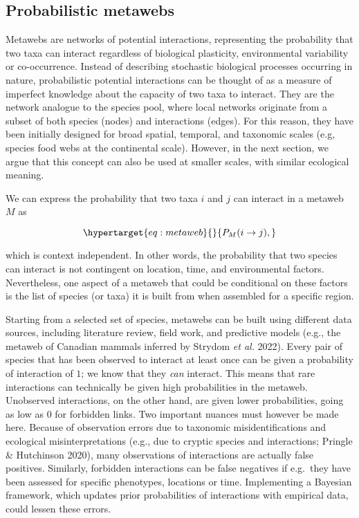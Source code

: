 \documentclass[11pt]{article}
\begin{document}
\hypertarget{probabilistic-metawebs}{%
\subsection{Probabilistic metawebs}\label{probabilistic-metawebs}}

Metawebs are networks of potential interactions, representing the
probability that two taxa can interact regardless of biological
plasticity, environmental variability or co-occurrence. Instead of
describing stochastic biological processes occurring in nature,
probabilistic potential interactions can be thought of as a measure of
imperfect knowledge about the capacity of two taxa to interact. They are
the network analogue to the species pool, where local networks originate
from a subset of both species (nodes) and interactions (edges). For this
reason, they have been initially designed for broad spatial, temporal,
and taxonomic scales (e.g, species food webs at the continental scale).
However, in the next section, we argue that this concept can also be
used at smaller scales, with similar ecological meaning.

We can express the probability that two taxa \(i\) and \(j\) can
interact in a metaweb \(M\) as

\begin{equation}\protect\hypertarget{eq:metaweb}{}{P_{M}(i \rightarrow j),}\label{eq:metaweb}\end{equation}

which is context independent. In other words, the probability that two
species can interact is not contingent on location, time, and
environmental factors. Nevertheless, one aspect of a metaweb that could
be conditional on these factors is the list of species (or taxa) it is
built from when assembled for a specific region.

Starting from a selected set of species, metawebs can be built using
different data sources, including literature review, field work, and
predictive models (e.g., the metaweb of Canadian mammals inferred by
Strydom \emph{et al.} 2022). Every pair of species that has been
observed to interact at least once can be given a probability of
interaction of \(1\); we know that they \emph{can} interact. This means
that rare interactions can technically be given high probabilities in
the metaweb. Unobserved interactions, on the other hand, are given lower
probabilities, going as low as \(0\) for forbidden links. Two important
nuances must however be made here. Because of observation errors due to
taxonomic misidentifications and ecological misinterpretations (e.g.,
due to cryptic species and interactions; Pringle \& Hutchinson 2020),
many observations of interactions are actually false positives.
Similarly, forbidden interactions can be false negatives if e.g.~they
have been assessed for specific phenotypes, locations or time.
Implementing a Bayesian framework, which updates prior probabilities of
interactions with empirical data, could lessen these errors.
\end{document}
